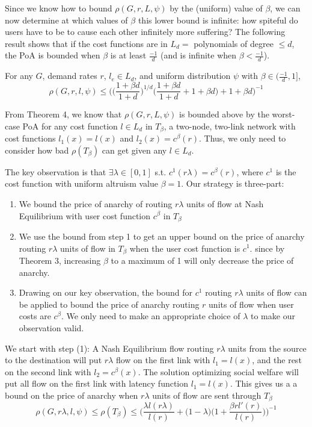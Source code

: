 Since we know how to bound $\rho(G,r,{L},\psi)$ by the (uniform) value of $\beta$, we can now determine at which values of $\beta$ this lower bound is infinite: how spiteful do users have to be to cause each other infinitely more suffering? The following result shows that if the cost functions are in $L_d =$ polynomials of degree $\le d$, the PoA is bounded when $\beta$ is at least $\frac{-1}{d}$ (and is infinite when $\beta < \frac{-1}d$).
\begin{theorem}
For any $G$, demand rates $r$, $l_e \in L_d$,
and uniform distribution $\psi$ with $\beta \in (\frac{-1}{d}, 1]$,
    $$\rho(G,r,l,\psi) \le \Big(\Big(\frac{1+\beta d}{1+d}\Big)^{1/d}\Big(\frac{1+\beta d}{1+d} + 1 + \beta d\Big)+ 1 + \beta d\Big)^{-1}$$
\end{theorem}
\begin{proof-sketch}
From Theorem 4, we know that 
$\rho(G,r,{L},\psi)$%
 is bounded above by the worst-case PoA for any cost function $l \in L_d$ in $T_\beta$, a two-node, two-link network with cost functions $l_1(x) = l(x)$ and $l_2(x) = c^\beta(r)$.
Thus, we only need to consider how bad $\rho(T_\beta)$ can get given any $l\in L_d$.

The key observation is that $\exists\lambda \in [0,1]$ s.t. $c^1(r\lambda) = c^\beta(r)$, where $c^1$ is the cost function with uniform altruism value $\beta=1$. Our strategy is three-part: 
\begin{enumerate}
    \item We bound the price of anarchy of routing $r\lambda$ units of flow at Nash Equilibrium with user cost function $c^\beta$ in $T_\beta$
   \item We use the bound from step 1 to get an upper bound on the price of anarchy routing $r\lambda$ units of flow in $T_\beta$ when the user cost function is $c^1$. since by Theorem 3, increasing $\beta$ to a maximum of 1 will only decrease the price of anarchy. 
    \item Drawing on our key observation, the bound for $c^1$ routing $r\lambda$ units of flow can be applied to bound the price of anarchy routing $r$ units of flow when user costs are $c^\beta$.
We only need to make an appropriate choice of $\lambda$ to make our observation valid.
\end{enumerate}

We start with step (1): A Nash Equilibrium flow routing $r\lambda$ units from the source to the destination will put $r\lambda$ flow on the first link with $l_1 = l(x)$, and the rest on the second link with $l_2 = c^\beta(x)$. The solution optimizing social welfare will put all flow on the first link with latency function $l_1 = l(x)$.
This gives us a a bound on the price of anarchy when $r\lambda$ units of flow are sent through $T_\beta$ 
    $$\rho(G,r\lambda,l,\psi) \le \rho(T_\beta) \le \Big(\frac{\lambda l(r\lambda)}{l(r)} + \Big(1-\lambda\Big)\Big(1+\frac{\beta rl'(r)}{l(r)}\Big)\Big)^{-1}$$
    

\end{proof-sketch}
